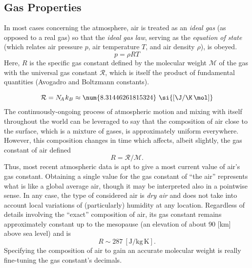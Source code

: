\documentclass[11pt,dvipsnames]{thesis}
\begin{document}
\subsection{Gas Properties}
In most cases concerning the atmosphere, air is treated as an \textit{ideal gas} (as opposed to a real gas) so that the \textit{ideal gas law}, serving as the \textit{equation of state} (which relates air pressure $p$, air temperature $T$, and air density $\rho$), is obeyed.
\begin{equation}
p = \rho R T \label{eq:IdealGasLaw}
\end{equation}
Here, $R$ is the specific gas constant defined by the molecular weight $\mathcal{M}$ of the gas with the universal gas constant $\mathcal{R}$, which is itself the product of fundamental quantities (Avogadro and Boltzmann constants).

\begin{equation}
\mathcal{R} = N_{\!A} \hspace{0.225ex} k_B \approx \num{8.31446261815324}\ \si{[\J / \K \,\mol]}
\end{equation}
The continuously-ongoing process of atmospheric motion and mixing with itself throughout the world can be leveraged to say that the composition of air close to the surface, which is a mixture of gases, is approximately uniform everywhere. However, this composition changes in time
which affects, albeit slightly, the gas constant of air defined
\begin{equation}
R = \mathcal{R} / \mathcal{M}. \label{eq:gasConstant}
\end{equation}
Thus, most recent atmospheric data is apt to give a most current value of air's gas constant. Obtaining a single value for the gas constant of ``the air'' represents what is like a global average air, though it may be interpreted also in a pointwise sense. In any case, the type of considered air is \textit{dry air} and does not take into account local variations of (particularly) humidity at any location. Regardless of details involving the ``exact'' composition of air, its gas constant remains approximately constant up to the mesopause (an elevation of about 90 [\si{\km}] above sea level) and is
\begin{equation}
R \sim 287 \ [\si{\J / \kg\,\K}].
\end{equation}
Specifying the composition of air to gain an accurate molecular weight is really fine-tuning the gas constant's decimals.
\end{document}
